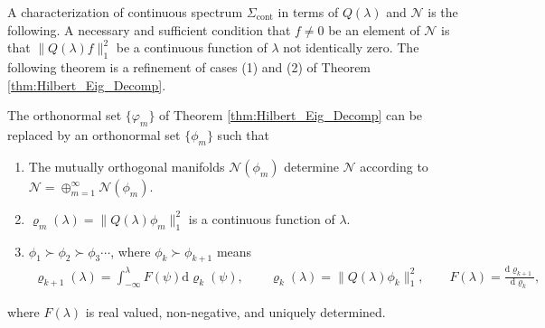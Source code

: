 \documentclass[leqno,onefignum,onetabnum]{siamltex1213}
\renewcommand{\d}{\mathrm{d}}
\newcommand{\Sigc}{\Sigma_{\text{cont}}}
\newcommand{\Nc}{\mathcal{N}}
\begin{document}
A characterization of continuous spectrum $\Sigc$ in terms of $Q(\lambda)$
and $\Nc$ is the following. A necessary and sufficient condition that
$f\neq0$ be an element of $\Nc$ is that $\|Q(\lambda)f\|_1^2$ be a continuous
function of $\lambda$ not identically zero. The following theorem is a
refinement of cases (1) and (2) of Theorem
\ref{thm:Hilbert_Eig_Decomp}.
%
\begin{theorem}
\label{thm:Cont_Spec}  
The orthonormal set $\{\varphi_m\}$ of Theorem \ref{thm:Hilbert_Eig_Decomp}
can be replaced by an orthonormal set $\{\phi_m\}$ such that
%
\begin{enumerate}
\item The mutually orthogonal manifolds $\Nc(\phi_m)$ determine $\Nc$
  according to $\Nc=\oplus_{m=1}^\infty\Nc(\phi_m)$. 
\item $\varrho_m(\lambda)=\|Q(\lambda)\phi_m\|_1^2$ is a continuous function of $\lambda$.
\item $\phi_1\succ\phi_2\succ\phi_3\cdots$, where $\phi_k\succ\phi_{k+1}$ means
%
\begin{align}
  \varrho_{k+1}(\lambda)=\int_{-\infty}^\lambda F(\psi)\d\varrho_k(\psi), \qquad
  \varrho_k(\lambda)=\|Q(\lambda)\phi_k\|_1^2, \qquad
  F(\lambda)=\frac{\d\varrho_{k+1}}{\d\varrho_k},
\end{align}
%
\end{enumerate}
%
where $F(\lambda)$ is real valued, non-negative, and uniquely determined.
\end{theorem}
%
\end{document}
